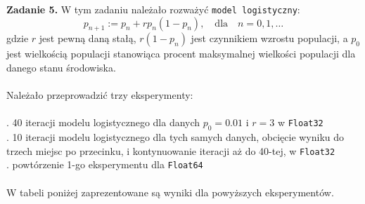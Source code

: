 \documentclass[15pt, a4paper]{article}
\begin{document}
\noindent\hrulefill


\vspace{0.5cm}

\noindent\textbf{Zadanie 5.} W tym zadaniu należało rozważyć \verb|model logistyczny|:
\[
p_{n+1} := p_n + r p_n (1 - p_n), \quad \mathrm{dla } \quad n = 0, 1, \ldots
\]
gdzie \(r\) jest pewną daną stałą, \(r(1 - p_n)\) jest czynnikiem wzrostu populacji, a \(p_0\) jest
wielkością populacji stanowiąca procent maksymalnej wielkości populacji dla danego
stanu środowiska.\\\\
\noindent Należało przeprowadzić trzy eksperymenty: \\\\
. 40 iteracji modelu logistycznego dla danych \(p_0 = 0.01\) i \(r = 3\) w \verb|Float32| \\
. 10 iteracji modelu logistycznego dla tych samych danych, obcięcie wyniku do trzech miejsc po przecinku, i kontynuowanie iteracji aż do 40-tej, w \verb|Float32| \\
. powtórzenie 1-go eksperymentu dla \verb|Float64| \\\\

\noindent W tabeli poniżej zaprezentowane są wyniki dla powyższych eksperymentów. 
\vspace{0.5cm}
\end{document}
